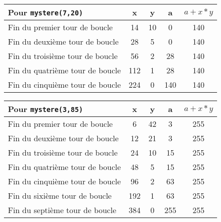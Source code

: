 \ifprof
\begin{corrige}
\begin{center}
\begin{tabular}{l c c c c }
\hline
Pour \texttt{mystere(7,20)} & x  & y & a & $a+x*y$ \\
\hline
\hline
Fin du premier tour de boucle     &14 & 10 & 0 & 140 \\ \hline
Fin du deuxième tour de boucle  & 28 & 5 & 0 & 140\\ \hline
Fin du troisième tour de boucle   & 56 & 2 & 28 & 140\\ \hline
Fin du quatrième tour de boucle &  112 & 1 & 28 & 140\\ \hline
Fin du cinquième tour de boucle & 224 & 0 & 140 & 140\\ \hline
\end{tabular}
\end{center}
\end{corrige}
\else
\fi

\ifprof
\begin{corrige}
\begin{tabular}{l c c c c }
\hline
Pour \texttt{mystere(3,85)} & x  & y & a & $a+x*y$ \\
\hline
\hline
Fin du premier tour de boucle     & 6    & 42 & 3     & 255\\ \hline
Fin du deuxième tour de boucle & 12   & 21 &3      & 255 \\ \hline
Fin du troisième tour de boucle  & 24   & 10 & 15   & 255 \\ \hline
Fin du quatrième tour de boucle & 48   & 5 & 15     & 255 \\ \hline
Fin du cinquième tour de boucle & 96   & 2  & 63    & 255 \\ \hline
Fin du sixième tour de boucle     & 192  & 1 & 63    & 255 \\ \hline
Fin du septième tour de boucle   & 384 & 0 &  255 & 255 \\ \hline
\end{tabular}
\end{corrige}
\else
\fi

